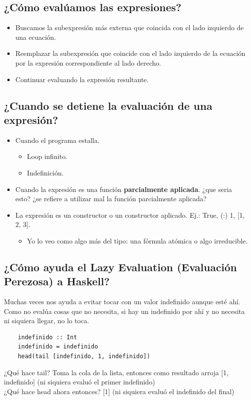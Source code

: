 \documentclass[10pt,a4paper]{article}
\begin{document}
\subsection*{¿Cómo evalúamos las expresiones?}
\begin{itemize}
    \item Buscamos la subexpresión más externa que coincida con el lado izquierdo de una ecuación.
    \item Reemplazar la subexpresión que coincide con el lado izquierdo de la ecuación por la expresión correspondiente al lado derecho.
    \item Continuar evaluando la expresión resultante.
\end{itemize}
\subsection*{¿Cuando se detiene la evaluación de una expresión?}
\begin{itemize}
    \item Cuando el programa estalla.
    \begin{itemize}
        \item Loop infinito.
        \item Indefinición.
    \end{itemize}
    \item Cuando la expresión es una función \textbf{parcialmente aplicada}. ¿que seria esto? ¿se refiere a utilizar mal la función parcialmente aplicada? 
    \item La expresión es un constructor o un constructor aplicado. Ej.: True, (:) 1, [1, 2, 3]. 
    \begin{itemize}
        \item Yo lo veo como algo más del tipo: una fórmula atómica o algo irreducible.
    \end{itemize}
\end{itemize}
\subsection*{¿Cómo ayuda el Lazy Evaluation (Evaluación Perezosa) a Haskell?}
Muchas veces nos ayuda a evitar tocar con un valor indefinido aunque esté ahí. Como no evalúa cosas que no necesita, si hay un indefinido por ahí y no necesita ni siquiera llegar, no lo toca.
\begin{lstlisting}
    indefinido :: Int 
    indefinido = indefinido 
    head(tail [indefinido, 1, indefinido])
\end{lstlisting}
¿Qué hace tail? Toma la cola de la lista, entonces como resultado arroja [1, indefinido] (ni siquiera evaluó el primer indefinido) \\ 
¿Qué hace head ahora entonces? [1] (ni siquiera evaluó el indefinido del final)
\end{document}
